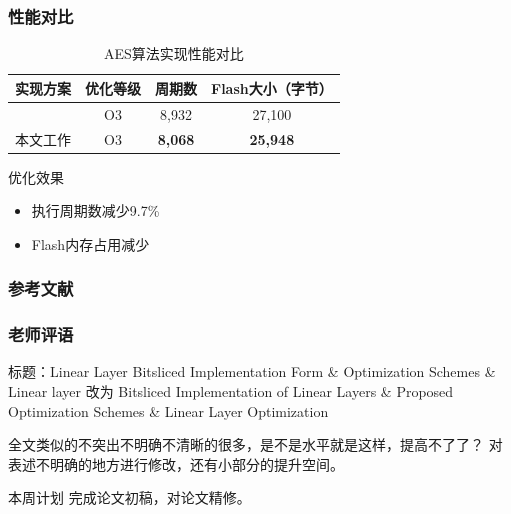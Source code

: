 \documentclass{beamer}
\begin{document}
\begin{frame}
    \frametitle{性能对比}
    \begin{table}
        \centering
        \caption{AES算法实现性能对比}
        \begin{tabular}{lccc}
            \toprule
            实现方案 & 优化等级 & 周期数 & Flash大小（字节） \\
            \midrule
            \cite{Schwabe2016} & O3 & 8,932 & 27,100 \\
            本文工作 & O3 & \textbf{8,068} & \textbf{25,948} \\
            \bottomrule
        \end{tabular}
    \end{table}
    
    \begin{block}{优化效果}
        \begin{itemize}
            \item 执行周期数减少9.7\%
            \item Flash内存占用减少
        \end{itemize}
    \end{block}
\end{frame}

\begin{frame}[allowframebreaks]
    \frametitle{参考文献}
    
\end{frame}

\begin{frame}
    \frametitle{老师评语}
    \begin{block}{标题：Linear Layer Bitsliced Implementation Form \& Optimization Schemes \& Linear layer}
        改为 Bitsliced Implementation of Linear Layers \& Proposed Optimization Schemes \& Linear Layer Optimization
    \end{block}

    \begin{block}{全文类似的不突出不明确不清晰的很多，是不是水平就是这样，提高不了了？}
        对表述不明确的地方进行修改，还有小部分的提升空间。
    \end{block}
    \begin{alertblock}{本周计划}
        完成论文初稿，对论文精修。
    \end{alertblock}
\end{frame}
\end{document}

